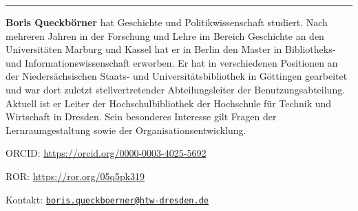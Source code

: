\begin{center}\rule{0.5\linewidth}{0.5pt}\end{center}

\textbf{Boris Queckbörner} hat Geschichte und Politikwissenschaft
studiert. Nach mehreren Jahren in der Forschung und Lehre im Bereich
Geschichte an den Universitäten Marburg und Kassel hat er in Berlin den
Master in Bibliotheks- und Informationswissenschaft erworben. Er hat in
verschiedenen Positionen an der Niedersächsischen Staats- und
Universitätsbibliothek in Göttingen gearbeitet und war dort zuletzt
stellvertretender Abteilungsleiter der Benutzungsabteilung. Aktuell ist
er Leiter der Hochschulbibliothek der Hochschule für Technik und
Wirtschaft in Dresden. Sein besonderes Interesse gilt Fragen der
Lernraumgestaltung sowie der Organisationsentwicklung.

ORCID: \url{https://orcid.org/0000-0003-4025-5692}

ROR: \url{https://ror.org/05q5pk319}

Kontakt:
\href{mailto:boris.queckboerner@htw-dresden.de}{\nolinkurl{boris.queckboerner@htw-dresden.de}}
